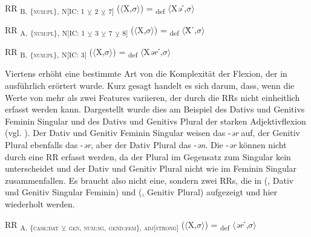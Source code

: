 \begin{exe}
\begin{exe}
\ea%
    \label{ex:key:45}
 RR \textsubscript{B,} \textsubscript{\{\textsc{num:pl}\},} \textsubscript{N[IC: 1} \textsubscript{${\veebar}$}\textsubscript{ 2} \textsubscript{${\veebar}$}\textsubscript{ 7]} ($\langle$X,$\sigma$$\rangle$) = \textsubscript{def} $\langle$X\textit{ə}ˊ,$\sigma$$\rangle$
\z

\begin{exe}%
RR \textsubscript{A,} \textsubscript{\{\textsc{num:pl}\},}
\textsubscript{N[IC: 1} \textsubscript{${\veebar}$}\textsubscript{ 3} \textsubscript{${\veebar}$}\textsubscript{ 7} \textsubscript{${\veebar}$}\textsubscript{ 8]} ($\langle$X,$\sigma$$\rangle$) = \textsubscript{def} $\langle$Ẍˊ,$\sigma$$\rangle$
\end{exe}

\begin{exe}%
 RR \textsubscript{B,} \textsubscript{\{\textsc{num:pl}\},} \textsubscript{N[IC: 3]} ($\langle$X,$\sigma$$\rangle$) = \textsubscript{def} $\langle$X\textit{ər}ˊ,$\sigma$$\rangle$
\end{exe}

Viertens erhöht eine bestimmte Art von  die Komplexität der Flexion, der in  ausführlich erörtert wurde. Kurz gesagt handelt es sich darum, dass, wenn die Werte von mehr als zwei Features variieren, der  durch die RRs nicht einheitlich erfasst werden kann. Dargestellt wurde dies am Beispiel des Dativs und Genitivs Feminin Singular und des Dativs und Genitivs Plural der starken Adjektivflexion (vgl. ). Der Dativ und Genitiv Feminin Singular weisen das  -\textit{ər} auf, der Genitiv Plural ebenfalls das  -\textit{ər}, aber der Dativ Plural das  -\textit{ən}. Die  -\textit{ər} können nicht durch eine RR erfasst werden, da der Plural im Gegensatz zum Singular kein  unterscheidet und der Dativ und Genitiv Plural nicht wie im Feminin Singular zusammenfallen. Es braucht also nicht eine, sondern zwei RRs, die in (, Dativ und Genitiv Singular Feminin) und (, Genitiv Plural) aufgezeigt und hier wiederholt werden.\largerpage

\begin{exe}%
 RR \textsubscript{A, \{\textsc{case:dat}} \textsubscript{${\veebar}$}\textsubscript{ \textsc{gen}, \textsc{num:sg}}\textsubscript{,} \textsubscript{\textsc{gend:fem}\}, \textsc{adj[strong]}} ($\langle$X,$\sigma$$\rangle$) = \textsubscript{def} $\langle$\textit{ər}ˊ,$\sigma$$\rangle$
\end{exe}


\end{exe}
\end{exe}

